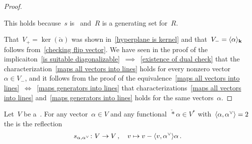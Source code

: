 \begin{proof}
\begin{implicationlist}
      This holds because~$s$ is~{\linear{$\kf$}} and~$R$ is a generating set for~$R$.
  \end{implicationlist}
  That~$V_+ = \ker(\check{\alpha})$ was shown in~\eqref{hyperplane is kernel} and that~$V_- = \langle\alpha\rangle_{\mathbf{k}}$ follows from~\eqref{checking flip vector}.
  We have seen in the proof of the implicaiton~\ref*{is suitable diagonalizable}~$\implies$~\ref*{existence of dual check} that the characterization~\ref*{maps all vectors into lines} holds for every nonzero vector~$\alpha \in V_-$, and it follows from the proof of the equivalence~\ref*{maps all vectors into lines}~$\iff$~\ref*{maps generators into lines} that characterizations~\ref*{maps all vectors into lines} and~\ref*{maps generators into lines} holds for the same vectors~$\alpha$.
\end{proof}


\begin{definition}
  Let~$V$ be a~{\vectorspace{$\kf$}}.
  For any vector~$\alpha \in V$ and any functional~$\check*{\alpha} \in V^*$ with~$\pair{\alpha, \check{\alpha}} = 2$ the  is the reflection
  \[
    s_{\alpha, \check{\alpha}}
    \colon
    V
    \to
    V \,,
    \quad
    v
    \mapsto
    v - \pair{v, \check{\alpha}} \alpha \,.
  \]
\end{definition}


